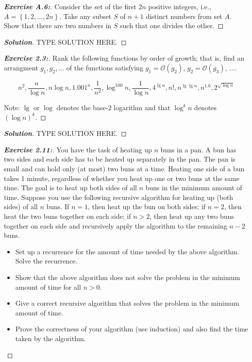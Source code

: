 \documentclass[a4paper]{article}
\newenvironment{solution}{\begin{proof}[\textnormal{\textbf{Solution}}]}{\end{proof}}
\newenvironment{exercise}[1]{\begin{proof}[\textnormal{\textbf{Exercise #1:}}]\renewcommand{\qedsymbol}{}}{\end{proof}}
\newcommand{\bigO}[1]{\mathcal{O}\left(#1\right)}
\newcommand{\set}[1]{\left\lbrace#1\right\rbrace}
\begin{document}
\begin{exercise}{A.6}
    Consider the set of the first \(2n\) positive integers, i.e., \(A = \set{1, 2, \hdots, 2n}\). Take any subset \(S\) of \(n + 1\) distinct numbers from set \(A\). Show that there are two numbers in \(S\) such that one divides the other.
\end{exercise}

\begin{solution}
    TYPE SOLUTION HERE.
\end{solution}

\begin{exercise}{2.3}
    Rank the following functions by order of growth; that is, find an arrangment \(g_1, g_2, \hdots\) of the functions satisfying \(g_1 = \bigO{g_2}\), \(g_2 = \bigO{g_3}\), \(\hdots\).

    \[n^2, \frac{n}{\log{n}}, n\log{n}, 1.001^n, \frac{1}{n^2}, \log^{100}{n}, \frac{1}{\log{n}}, 4^{\lg{n}}, n!, n^{\lg{\lg{n}}}, n^{1.6}, 2^{\sqrt{\log{n}}}\]

    Note: \(\lg\) or \(\log\) denotes the base-2 logarithm and that \(\log^k{n}\) denotes \((\log{n})^k\).
\end{exercise}

\begin{solution}
    TYPE SOLUTION HERE.
\end{solution}

\begin{exercise}{2.11}

    You have the task of heating up \(n\) buns in a pan. A bun has two sides and each side has to be heated up separately in the pan. The pan is small and can hold only (at most) two buns at a time. Heating one side of a bun takes 1 minute, regardless of whether you heat up one or two buns at the same time. The goal is to heat up both sides of all \(n\) buns in the minimum amount of time. Suppose you use the following recursive algorithm for heating up (both sides) of all \(n\) buns. If \(n = 1\), then heat up the bun on both sides;  if \(n = 2\), then heat the two buns together on each side; if \(n > 2\), then heat up any two buns together on each side and recursively apply the algorithm to the remaining \(n − 2\) buns.

    \begin{itemize}
        \item Set up a recurrence for the amount of time needed by the above algorithm. Solve the recurrence.
        \item Show that the above algorithm does not solve the problem in the minimum amount of time for all \(n >0\).
        \item Give a correct recursive algorithm that solves the problem in the minimum amount of time.
        \item Prove the correctness of your algorithm (use induction) and also find the time taken by the algorithm.
    \end{itemize}
\end{exercise}
\end{document}
